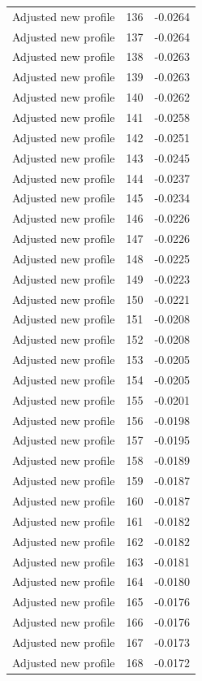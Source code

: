 \begin{table}[htbp]
\begin{tabular}{lll}
Adjusted new profile & 136 & -0.0264 \\
Adjusted new profile & 137 & -0.0264 \\
Adjusted new profile & 138 & -0.0263 \\
Adjusted new profile & 139 & -0.0263 \\
Adjusted new profile & 140 & -0.0262 \\
Adjusted new profile & 141 & -0.0258 \\
Adjusted new profile & 142 & -0.0251 \\
Adjusted new profile & 143 & -0.0245 \\
Adjusted new profile & 144 & -0.0237 \\
Adjusted new profile & 145 & -0.0234 \\
Adjusted new profile & 146 & -0.0226 \\
Adjusted new profile & 147 & -0.0226 \\
Adjusted new profile & 148 & -0.0225 \\
Adjusted new profile & 149 & -0.0223 \\
Adjusted new profile & 150 & -0.0221 \\
Adjusted new profile & 151 & -0.0208 \\
Adjusted new profile & 152 & -0.0208 \\
Adjusted new profile & 153 & -0.0205 \\
Adjusted new profile & 154 & -0.0205 \\
Adjusted new profile & 155 & -0.0201 \\
Adjusted new profile & 156 & -0.0198 \\
Adjusted new profile & 157 & -0.0195 \\
Adjusted new profile & 158 & -0.0189 \\
Adjusted new profile & 159 & -0.0187 \\
Adjusted new profile & 160 & -0.0187 \\
Adjusted new profile & 161 & -0.0182 \\
Adjusted new profile & 162 & -0.0182 \\
Adjusted new profile & 163 & -0.0181 \\
Adjusted new profile & 164 & -0.0180 \\
Adjusted new profile & 165 & -0.0176 \\
Adjusted new profile & 166 & -0.0176 \\
Adjusted new profile & 167 & -0.0173 \\
Adjusted new profile & 168 & -0.0172 \\

\end{tabular}
\end{table}
